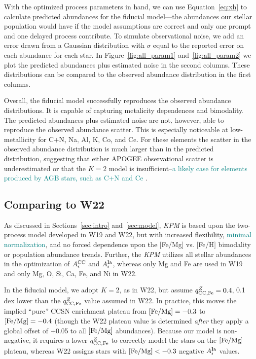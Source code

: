\documentclass[modern]{aastex631}
\newcommand{\femg}{[{\rm Fe}/{\rm Mg}]}
\newcommand{\qccFe}{q_{{\rm CC, Fe}}^{Z}}
\newcommand{\Acc}{A^{\rm CC}_{i}}
\newcommand{\AIa}{A^{\rm Ia}_{i}}
\newcommand{\add}[1]{\textcolor{teal}{#1}}
\newcommand{\name}{\textsl{KPM}}
\begin{document}
With the optimized process parameters in hand, we can use Equation~\ref{eq:xh} to calculate predicted abundances for the fiducial model---the abundances our stellar population would have if the model assumptions are correct and only one prompt and one delayed process contribute. To simulate observational noise, we add an error drawn from a Gaussian distribution with $\sigma$ equal to the reported error on each abundance for each star. In Figure~\ref{fig:all_param1} and~\ref{fig:all_param2} we plot the predicted abundances plus estimated noise in the second columns. These distributions can be compared to the observed abundance distribution in the first columns.

Overall, the fiducial model successfully reproduces the observed abundance distributions. It is capable of capturing metalicity dependences and bimodality. The predicted abundances plus estimated noise are not, however, able to reproduce the observed abundance scatter. This is especially noticeable at low-metallicity for C+N, Na, Al, K, Co, and Ce. For these elements the scatter in the observed abundance distribution is much larger than in the predicted distribution, suggesting that either APOGEE observational scatter is underestimated or that the $K=2$ model is insufficient--\add{a likely case for elements produced by AGB stars, such as C+N and Ce }.

\subsection{Comparing to W22}\label{subsec:w22}

As discussed in Sections~\ref{sec:intro} and~\ref{sec:model}, \name{} is based upon the two-process model developed in W19 and W22, but with increased flexibility, \add{minimal normalization}, and no forced dependence upon the [Fe/Mg] vs. [Fe/H] bimodality or population abundance trends. Further, the \name{} utilizes all stellar abundances in the optimization of $\Acc$ and $\AIa$, whereas only Mg and Fe are used in W19 and only Mg, O, Si, Ca, Fe, and Ni in W22. 

In the fiducial model, we adopt $K=2$, as in W22, but assume $\qccFe = 0.4$, 0.1 dex lower than the $\qccFe$ value assumed in W22. In practice, this moves the implied ``pure'' CCSN enrichment plateau from $\femg=-0.3$ to $\femg=-0.4$ (though the W22 plateau value is determined \textit{after} they apply a global offset of +0.05 to all $\femg$ abundances). Because our model is non-negative, it requires a lower $\qccFe$ to correctly model the stars on the $\femg$ plateau, whereas W22 assigns stars with $\femg < -0.3$ negative $\AIa$ values.
\end{document}
